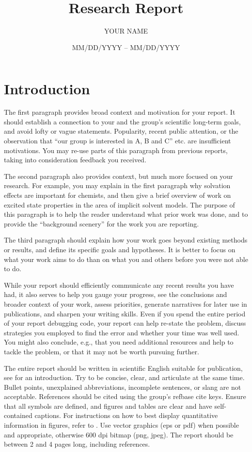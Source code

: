 \documentclass[11pt]{article}
\title{\textbf{Research Report}}
\author{YOUR NAME}
\date{MM/DD/YYYY -- MM/DD/YYYY }
\begin{document}
\maketitle

\section{Introduction}

The first paragraph provides broad context and motivation for your
report. It should establish a connection to your and the group's scientific
long-term goals, and avoid lofty or vague statements. Popularity,
recent public attention, or the observation that ``our group is
interested in A, B and C'' etc. are insufficient motivations. You may
re-use parts of this paragraph from previous reports, taking into
consideration feedback you received. 

The second paragraph also provides context, but much more focused on
your research. For example, you may explain in the first paragraph why
solvation effects are important for chemists, and then give a brief
overview of work on excited state properties in the area of implicit
solvent models. The purpose of this paragraph is to help the reader
understand what prior work was done, and to provide the ``background
scenery'' for the work you are reporting. 

The third paragraph should explain how your work goes beyond existing
methods or results, and define its specific goals and
hypotheses. It is better to focus on what your work aims to do than on
what you and others before you were not able to do. 

While your report should efficiently communicate any recent results you
have had, it also serves to help you gauge your progress, see the
conclusions and broader context of your work, assess priorities,
generate narratives for later use in publications, and sharpen your
writing skills. Even if you spend the entire period of your report
debugging code, your report can help re-state the problem, discuss
strategies you employed to find the error and whether your time was well
used. You might also conclude, e.g., that you need additional resources
and help to tackle the problem, or that it may not be worth pursuing
further. 

The entire report should be written in scientific English suitable for
publication, see \textcite{Strunk99} for an introduction. Try to be
concise, clear, and articulate at the same time. Bullet points,
unexplained abbreviations, incomplete sentences, or slang are not
acceptable. References should be cited using the group's refbase cite
keys. Ensure that all symbols are defined, and figures and tables
are clear and have self-contained captions. For instructions on how to
best display quantitative information in figures, refer to
\textcite{Tufte01}. Use 
vector graphics (eps or pdf) when possible and appropriate, otherwise
600 dpi bitmap (png, jpeg). The report should be between 2 and 4 pages
long, including references.
\end{document}
